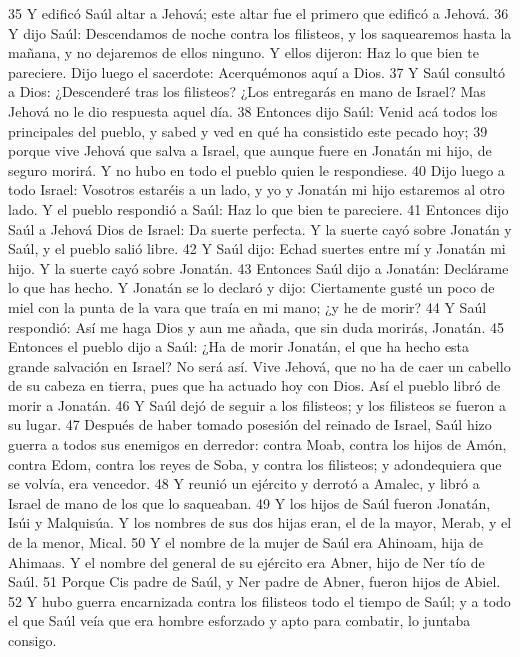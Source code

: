 35 Y edificó Saúl altar a Jehová; este altar fue el primero que edificó a Jehová.
36 Y dijo Saúl: Descendamos de noche contra los filisteos, y los saquearemos hasta la mañana, y no dejaremos de ellos ninguno. Y ellos dijeron: Haz lo que bien te pareciere. Dijo luego el sacerdote: Acerquémonos aquí a Dios.
37 Y Saúl consultó a Dios: ¿Descenderé tras los filisteos? ¿Los entregarás en mano de Israel? Mas Jehová no le dio respuesta aquel día.
38 Entonces dijo Saúl: Venid acá todos los principales del pueblo, y sabed y ved en qué ha consistido este pecado hoy;
39 porque vive Jehová que salva a Israel, que aunque fuere en Jonatán mi hijo, de seguro morirá. Y no hubo en todo el pueblo quien le respondiese.
40 Dijo luego a todo Israel: Vosotros estaréis a un lado, y yo y Jonatán mi hijo estaremos al otro lado. Y el pueblo respondió a Saúl: Haz lo que bien te pareciere.
41 Entonces dijo Saúl a Jehová Dios de Israel: Da suerte perfecta. Y la suerte cayó sobre Jonatán y Saúl, y el pueblo salió libre.
42 Y Saúl dijo: Echad suertes entre mí y Jonatán mi hijo. Y la suerte cayó sobre Jonatán.
43 Entonces Saúl dijo a Jonatán: Declárame lo que has hecho. Y Jonatán se lo declaró y dijo: Ciertamente gusté un poco de miel con la punta de la vara que traía en mi mano; ¿y he de morir?
44 Y Saúl respondió: Así me haga Dios y aun me añada, que sin duda morirás, Jonatán.
45 Entonces el pueblo dijo a Saúl: ¿Ha de morir Jonatán, el que ha hecho esta grande salvación en Israel? No será así. Vive Jehová, que no ha de caer un cabello de su cabeza en tierra, pues que ha actuado hoy con Dios. Así el pueblo libró de morir a Jonatán.
46 Y Saúl dejó de seguir a los filisteos; y los filisteos se fueron a su lugar.
47 Después de haber tomado posesión del reinado de Israel, Saúl hizo guerra a todos sus enemigos en derredor: contra Moab, contra los hijos de Amón, contra Edom, contra los reyes de Soba, y contra los filisteos; y adondequiera que se volvía, era vencedor.
48 Y reunió un ejército y derrotó a Amalec, y libró a Israel de mano de los que lo saqueaban.
49 Y los hijos de Saúl fueron Jonatán, Isúi y Malquisúa. Y los nombres de sus dos hijas eran, el de la mayor, Merab, y el de la menor, Mical.
50 Y el nombre de la mujer de Saúl era Ahinoam, hija de Ahimaas. Y el nombre del general de su ejército era Abner, hijo de Ner tío de Saúl.
51 Porque Cis padre de Saúl, y Ner padre de Abner, fueron hijos de Abiel.
52 Y hubo guerra encarnizada contra los filisteos todo el tiempo de Saúl; y a todo el que Saúl veía que era hombre esforzado y apto para combatir, lo juntaba consigo.

